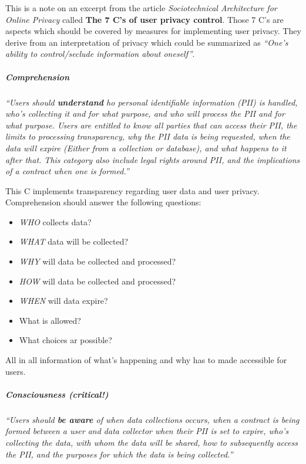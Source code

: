 This is a note on an excerpt from the article \emph{Sociotechnical
Architecture for Online Privacy} \cite{1} called
\textbf{The 7 C's of user privacy control}. Those 7 C's are aspects
which should be covered by measures for implementing user privacy. They
derive from an interpretation of privacy which could be summarized as
\emph{``One's ability to control/seclude information about oneself''}.



\subparagraph{Comprehension}

\emph{``Users should \textbf{understand} ho personal identifiable
information (PII) is handled, who's collecting it and for what purpose,
and who will process the PII and for what purpose. Users are entitled
to know all parties that can access their PII, the limits to processing
transparency, why the PII data is being requested, when the data will
expire (Either from a collection or database), and what happens to it
after that. This category also include legal rights around PII, and the
implications of a contract when one is formed.''}

This C implements transparency regarding user data and user privacy.
Comprehension should answer the following questions:

\begin{itemize}

\item
  \emph{WHO} collects data?
\item
  \emph{WHAT} data will be collected?
\item
  \emph{WHY} will data be collected and processed?
\item
  \emph{HOW} will data be collected and processed?
\item
  \emph{WHEN} will data expire?
\item
  What is allowed?
\item
  What choices ar possible?
\end{itemize}

All in all information of what's happening and why has to made
accessible for users.

\subparagraph{Consciousness \textbf{(critical!)}}

\emph{``Users should \textbf{be aware} of when data collections occurs,
when a contract is being formed between a user and data collector when
their PII is set to expire, who's collecting the data, with whom the
data will be shared, how to subsequently access the PII, and the
purposes for which the data is being collected.''}


